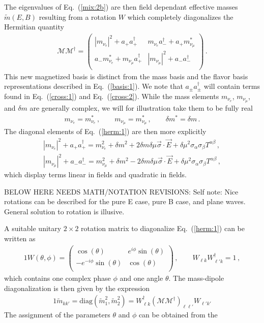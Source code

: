 \documentclass[addchapnum]{ws-rv961x669} %
\newcommand{\req}[1]{Eq.~(\ref{#1})}
\begin{document}
The eigenvalues of \req{mix:2b} are then field dependant effective masses $\tilde{m}(E,B)$ resulting from a rotation $W$ which completely diagonalizes the Hermitian quantity 
\begin{align}
    \label{herm:1}
    \mathcal{M}\mathcal{M}^{\dag}=
    \begin{pmatrix}
        |m_{\nu_{e}}|^{2}+a_{+}a_{+}^{\dag} & m_{\nu_{e}}a_{-}^{\dag}+a_{+}m_{\nu_{\mu}}^{*}\\
        a_{-}m_{\nu_{e}}^{*}+m_{\nu_{\mu}}a_{+}^{\dag} & |m_{\nu_{\mu}}|^{2}+a_{-}a_{-}^{\dag}\\
    \end{pmatrix}\,.
\end{align}
This new magnetized basis is distinct from the mass basis and the flavor basis representations described in \req{basis:1}. We note that $a_{\pm}a_{\pm}^{\dag}$ will contain terms found in \req{cross:1} and \req{cross:2}. While the mass elements $m_{\nu_{e}}$, $m_{\nu_{\mu}}$, and ${\delta m}$ are generally complex, we will for illustration take them to be fully real
\begin{gather}
    m_{\nu_{e}}=m_{\nu_{e}}^{*}\,,\qquad
    m_{\nu_{\mu}}=m_{\nu_{\mu}}^{*}\,,\qquad
    \delta m^{*}=\delta m\,.
\end{gather}
The diagonal elements of \req{herm:1} are then more explicitly
\begin{gather}
    \label{elements:1}
    |m_{\nu_{e}}|^{2}+a_{+}a_{+}^{\dag}=m_{\nu_{e}}^{2}+\delta m^{2}+2\delta m \delta\mu\vec{\sigma}\cdot\vec{E}+\delta\mu^{2}\sigma_{\alpha}\sigma_{\beta}T^{\alpha\beta}\,,\\
    |m_{\nu_{\mu}}|^{2}+a_{-}a_{-}^{\dag}=m_{\nu_{\mu}}^{2}+\delta m^{2}-2\delta m \delta\mu\vec{\sigma}\cdot\vec{E}+\delta\mu^{2}\sigma_{\alpha}\sigma_{\beta}T^{\alpha\beta}\,,
\end{gather}
which display terms linear in fields and quadratic in fields.

BELOW HERE NEEDS MATH/NOTATION REVISIONS: Self note: Nice rotations can be described for the pure E case, pure B case, and plane waves. General solution to rotation is illusive.

A suitable unitary $2\times2$ rotation matrix to diagonalize \req{herm:1} can be written as
\begin{alignat}{1}
	\label{mix:4} W(\theta,\phi) = 
    \left(
    \begin{array}{cc}
         \cos (\theta ) & e^{i \phi } \sin (\theta ) \\
         -e^{-i \phi } \sin (\theta ) & \cos (\theta ) \\
    \end{array}
    \right)\,,\qquad
    W_{\ell k}W^{\dag}_{\ell' k} = 1\,,
\end{alignat}
which contains one complex phase $\phi$ and one angle $\theta$. The mass-dipole diagonalization is then given by the expression
\begin{alignat}{1}
	\label{mix:5} \tilde{m}_{kk'} = \mathrm{diag}(\tilde{m}_{1}^{2},\tilde{m}_{2}^{2})=W_{\ell k}^{\dag}\left(\mathcal{M}\mathcal{M}^{\dag}\right)_{\ell\ell'}W_{\ell'k'}
\end{alignat}
The assignment of the parameters $\theta$ and $\phi$ can be obtained from the
\end{document}
